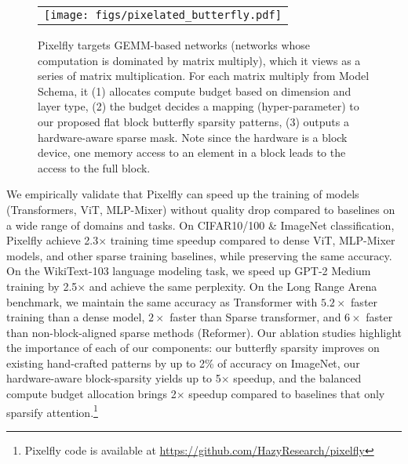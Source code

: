 \begin{figure}
\vspace{-1.2cm}
\captionsetup{font=small}
	\begin{center}
	\scriptsize
		\begin{tabular}{c}
			\texttt{[image: figs/pixelated\_butterfly.pdf]}
		\end{tabular}
	\end{center}
		\vspace{-0.4cm}
	\caption{Pixelfly targets GEMM-based networks (networks whose computation is dominated by matrix multiply), which it views as a series of matrix multiplication. For each matrix multiply from Model Schema, it (1) allocates compute budget based on dimension and layer type, (2) the budget decides a mapping (hyper-parameter) to our proposed flat block butterfly sparsity patterns, (3) outputs a hardware-aware sparse mask. Note since the hardware is a block device, one memory access to an element in a block leads to the access to the full block.}
	\label{fig:tradeoff}
	\vspace{-0.5cm}
\end{figure}

We empirically validate that Pixelfly can speed up the training of models (Transformers, ViT, MLP-Mixer) without quality drop compared to baselines on a wide range of domains and tasks.
On CIFAR10/100 \& ImageNet classification, Pixelfly achieve 2.3$\times$ training time speedup compared to dense ViT, MLP-Mixer models, and other sparse training baselines, while preserving the same accuracy. On the WikiText-103 language modeling task, we speed up GPT-2 Medium training by 2.5$\times$ and achieve the same perplexity. On the Long Range Arena benchmark, we maintain the same accuracy as Transformer with $5.2\times$ faster training than a dense model, $2\times$ faster than Sparse transformer, and $6\times$ faster than non-block-aligned sparse methods (Reformer).
Our ablation studies highlight the importance of each of our components:
our butterfly sparsity improves on existing hand-crafted patterns by up to 2\% of accuracy on ImageNet,
our hardware-aware block-sparsity yields up to 5$\times$ speedup, and the balanced compute budget allocation brings 2$\times$ speedup compared to baselines that only sparsify attention.\footnote{Pixelfly code is available at \url{https://github.com/HazyResearch/pixelfly}}




